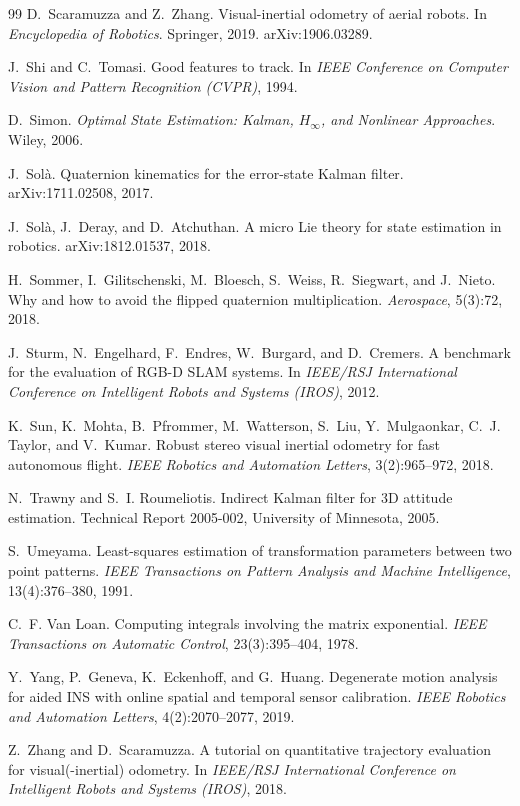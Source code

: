 \begin{thebibliography}{99}
 D.~Scaramuzza and Z.~Zhang. Visual-inertial odometry of aerial robots. In \emph{Encyclopedia of Robotics}. Springer, 2019. arXiv:1906.03289.

 J.~Shi and C.~Tomasi. Good features to track. In \emph{IEEE Conference on Computer Vision and Pattern Recognition (CVPR)}, 1994.

 D.~Simon. \emph{Optimal State Estimation: Kalman, $H_\infty$, and Nonlinear Approaches}. Wiley, 2006.

 J.~Sol\`a. Quaternion kinematics for the error-state Kalman filter. arXiv:1711.02508, 2017.

 J.~Sol\`a, J.~Deray, and D.~Atchuthan. A micro Lie theory for state estimation in robotics. arXiv:1812.01537, 2018.

 H.~Sommer, I.~Gilitschenski, M.~Bloesch, S.~Weiss, R.~Siegwart, and J.~Nieto. Why and how to avoid the flipped quaternion multiplication. \emph{Aerospace}, 5(3):72, 2018.

 J.~Sturm, N.~Engelhard, F.~Endres, W.~Burgard, and D.~Cremers. A benchmark for the evaluation of RGB-D SLAM systems. In \emph{IEEE/RSJ International Conference on Intelligent Robots and Systems (IROS)}, 2012.

 K.~Sun, K.~Mohta, B.~Pfrommer, M.~Watterson, S.~Liu, Y.~Mulgaonkar, C.~J. Taylor, and V.~Kumar. Robust stereo visual inertial odometry for fast autonomous flight. \emph{IEEE Robotics and Automation Letters}, 3(2):965--972, 2018.

 N.~Trawny and S.~I. Roumeliotis. Indirect Kalman filter for 3D attitude estimation. Technical Report 2005-002, University of Minnesota, 2005.

 S.~Umeyama. Least-squares estimation of transformation parameters between two point patterns. \emph{IEEE Transactions on Pattern Analysis and Machine Intelligence}, 13(4):376--380, 1991.

 C.~F. Van Loan. Computing integrals involving the matrix exponential. \emph{IEEE Transactions on Automatic Control}, 23(3):395--404, 1978.

 Y.~Yang, P.~Geneva, K.~Eckenhoff, and G.~Huang. Degenerate motion analysis for aided INS with online spatial and temporal sensor calibration. \emph{IEEE Robotics and Automation Letters}, 4(2):2070--2077, 2019.

 Z.~Zhang and D.~Scaramuzza. A tutorial on quantitative trajectory evaluation for visual(-inertial) odometry. In \emph{IEEE/RSJ International Conference on Intelligent Robots and Systems (IROS)}, 2018.

\end{thebibliography}

